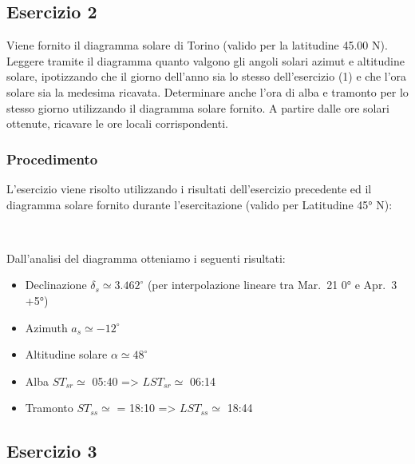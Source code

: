 \documentclass[11pt]{article}
\providecommand{\tightlist}{%
      \setlength{\itemsep}{0pt}\setlength{\parskip}{0pt}}
\begin{document}
    \hypertarget{esercizio-2}{%
\subsection{Esercizio 2}\label{esercizio-2}}

Viene fornito il diagramma solare di Torino (valido per la latitudine
45.00 N). Leggere tramite il diagramma quanto valgono gli angoli solari
azimut e altitudine solare, ipotizzando che il giorno dell'anno sia lo
stesso dell'esercizio (1) e che l'ora solare sia la medesima ricavata.
Determinare anche l'ora di alba e tramonto per lo stesso giorno
utilizzando il diagramma solare fornito. A partire dalle ore solari
ottenute, ricavare le ore locali corrispondenti.

    \hypertarget{procedimento}{%
\subsubsection{Procedimento}\label{procedimento}}

    L'esercizio viene risolto utilizzando i risultati dell'esercizio
precedente ed il diagramma solare fornito durante l'esercitazione
(valido per Latitudine 45° N):
 
            
    
    \begin{center}
    \end{center}
    { \hspace*{\fill} \\}
    

    Dall'analisi del diagramma otteniamo i seguenti risultati:

\begin{itemize}
\tightlist
\item
  Declinazione \(\delta_s \simeq 3.462^{{\circ}}\) (per interpolazione
  lineare tra Mar.~21 0° e Apr.~3 +5°)
\item
  Azimuth \(a_s \simeq -12^{{\circ}}\)
\item
  Altitudine solare \(\alpha \simeq 48^{{\circ}}\)
\item
  Alba \(ST_{sr} \simeq\) 05:40 =\textgreater{} \(LST_{sr} \simeq\)
  06:14
\item
  Tramonto \(ST_{ss} \simeq\) = 18:10 =\textgreater{}
  \(LST_{ss} \simeq\) 18:44
\end{itemize}

    \hypertarget{esercizio-3}{%
\subsection{Esercizio 3}\label{esercizio-3}}
\end{document}
